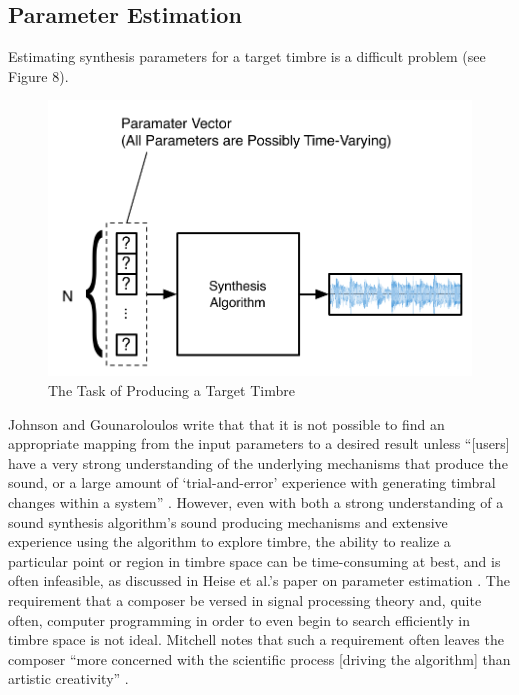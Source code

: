 \documentclass[12pt]{report} 	%
\numberwithin{figure}{chapter}
\numberwithin{table}{chapter}
\numberwithin{equation}{chapter}
\begin{document}
\begin{flushleft}
\section{Parameter Estimation}
Estimating synthesis parameters for a target timbre is a difficult problem (see Figure 8). 
\begin{figure}[h!]
\begin{center}
\includegraphics[scale=0.7]{ResynthesisProblem}
\caption[Producing a target timbre]{The Task of Producing a Target Timbre}
\end{center}
\end{figure}
Johnson and Gounaroloulos \cite{Johnson:2006pi} write that that it is not possible to find an appropriate mapping from the input parameters to a desired result unless ``[users] have a very strong understanding of the underlying mechanisms that produce the sound, or a large amount of `trial-and-error' experience with generating timbral changes within a system'' \cite[p. 1]{Johnson:2006pi}. However, even with both a strong understanding of a sound synthesis algorithm's sound producing mechanisms and extensive experience using the algorithm to explore timbre, the ability to realize a particular point or region in timbre space can be time-consuming at best, and is often infeasible, as discussed in Heise et al.'s paper on parameter estimation \cite[p. 1]{Heise:2009sp}. The requirement that a composer be versed in signal processing theory and, quite often, computer programming in order to even begin to search efficiently in timbre space is not ideal. Mitchell notes that such a requirement often leaves the composer ``more concerned with the scientific process [driving the algorithm] than artistic creativity'' \cite[p. 1]{Mitchell:2007fe}.


\end{flushleft}
\end{document}
